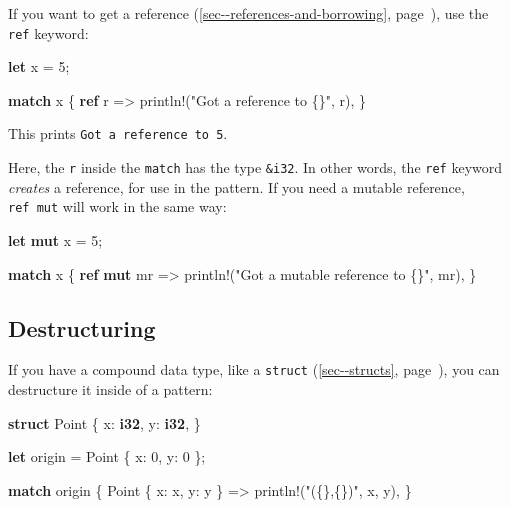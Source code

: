 \documentclass[a4paper,]{book}
\renewcommand*{\hyperref}[2][\ar]{%
  \def\ar{#2}%
  #2 (\autoref{#1}, page~\pageref{#1})}
\newenvironment{Shaded}{\begin{snugshade}}{\end{snugshade}}
\newcommand{\KeywordTok}[1]{\textcolor[rgb]{0.13,0.29,0.53}{\textbf{{#1}}}}
\newcommand{\DecValTok}[1]{\textcolor[rgb]{0.00,0.00,0.81}{{#1}}}
\newcommand{\StringTok}[1]{\textcolor[rgb]{0.31,0.60,0.02}{{#1}}}
\newcommand{\OtherTok}[1]{\textcolor[rgb]{0.56,0.35,0.01}{{#1}}}
\newcommand{\NormalTok}[1]{{#1}}
\begin{document}
If you want to get a
\hyperref[sec--references-and-borrowing]{reference}, use the
\texttt{ref} keyword:

\begin{Shaded}
\begin{Highlighting}[]
\KeywordTok{let} \NormalTok{x = }\DecValTok{5}\NormalTok{;}

\KeywordTok{match} \NormalTok{x \{}
    \KeywordTok{ref} \NormalTok{r => }\OtherTok{println!}\NormalTok{(}\StringTok{"Got a reference to \{\}"}\NormalTok{, r),}
\NormalTok{\}}
\end{Highlighting}
\end{Shaded}

This prints \texttt{Got\ a\ reference\ to\ 5}.

Here, the \texttt{r} inside the \texttt{match} has the type
\texttt{\&i32}. In other words, the \texttt{ref} keyword \emph{creates}
a reference, for use in the pattern. If you need a mutable reference,
\texttt{ref\ mut} will work in the same way:

\begin{Shaded}
\begin{Highlighting}[]
\KeywordTok{let} \KeywordTok{mut} \NormalTok{x = }\DecValTok{5}\NormalTok{;}

\KeywordTok{match} \NormalTok{x \{}
    \KeywordTok{ref} \KeywordTok{mut} \NormalTok{mr => }\OtherTok{println!}\NormalTok{(}\StringTok{"Got a mutable reference to \{\}"}\NormalTok{, mr),}
\NormalTok{\}}
\end{Highlighting}
\end{Shaded}

\subsection{Destructuring}\label{destructuring}

If you have a compound data type, like a
\hyperref[sec--structs]{\texttt{struct}}, you can destructure it inside
of a pattern:

\begin{Shaded}
\begin{Highlighting}[]
\KeywordTok{struct} \NormalTok{Point \{}
    \NormalTok{x: }\KeywordTok{i32}\NormalTok{,}
    \NormalTok{y: }\KeywordTok{i32}\NormalTok{,}
\NormalTok{\}}

\KeywordTok{let} \NormalTok{origin = Point \{ x: }\DecValTok{0}\NormalTok{, y: }\DecValTok{0} \NormalTok{\};}

\KeywordTok{match} \NormalTok{origin \{}
    \NormalTok{Point \{ x: x, y: y \} => }\OtherTok{println!}\NormalTok{(}\StringTok{"(\{\},\{\})"}\NormalTok{, x, y),}
\NormalTok{\}}
\end{Highlighting}
\end{Shaded}
\end{document}
